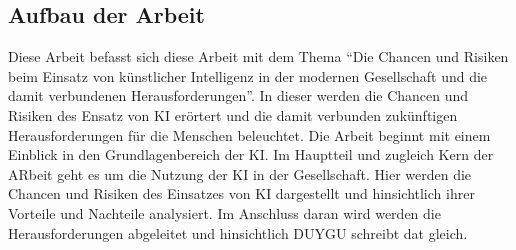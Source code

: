\subsection{Aufbau der Arbeit}
Diese Arbeit befasst sich diese Arbeit mit dem Thema \enquote{Die Chancen und Risiken beim Einsatz von künstlicher Intelligenz in der modernen Gesellschaft und die damit verbundenen Herausforderungen}.
In dieser werden die Chancen und Risiken des Ensatz von \ac{KI} erörtert und die damit verbunden zukünftigen Herausforderungen für die Menschen beleuchtet. Die Arbeit beginnt
mit einem Einblick in den Grundlagenbereich der \ac{KI}.
Im Hauptteil und zugleich Kern der ARbeit geht es um die Nutzung der \ac{KI} in der Gesellschaft. Hier werden die Chancen und Risiken des Einsatzes von \ac{KI} dargestellt und
hinsichtlich ihrer Vorteile und Nachteile analysiert. Im Anschluss daran wird werden die Herausforderungen abgeleitet und hinsichtlich DUYGU schreibt dat gleich.